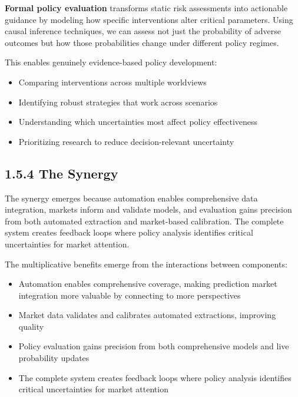 \documentclass[
  11pt,
  letterpaper,
]{book}
\providecommand{\tightlist}{%
  \setlength{\itemsep}{0pt}\setlength{\parskip}{0pt}}
\begin{document}
\textbf{Formal policy evaluation} transforms static risk assessments
into actionable guidance by modeling how specific interventions alter
critical parameters. Using causal inference techniques, we can assess
not just the probability of adverse outcomes but how those probabilities
change under different policy regimes.

This enables genuinely evidence-based policy development:

\begin{itemize}
\tightlist
\item
  Comparing interventions across multiple worldviews
\item
  Identifying robust strategies that work across scenarios
\item
  Understanding which uncertainties most affect policy effectiveness
\item
  Prioritizing research to reduce decision-relevant uncertainty
\end{itemize}

\subsection*{1.5.4 The Synergy}\label{sec-synergy}

The synergy emerges because automation enables comprehensive data
integration, markets inform and validate models, and evaluation gains
precision from both automated extraction and market-based calibration.
The complete system creates feedback loops where policy analysis
identifies critical uncertainties for market attention.

The multiplicative benefits emerge from the interactions between
components:

\begin{itemize}
\tightlist
\item
  Automation enables comprehensive coverage, making prediction market
  integration more valuable by connecting to more perspectives
\item
  Market data validates and calibrates automated extractions, improving
  quality
\item
  Policy evaluation gains precision from both comprehensive models and
  live probability updates
\item
  The complete system creates feedback loops where policy analysis
  identifies critical uncertainties for market attention
\end{itemize}
\end{document}

